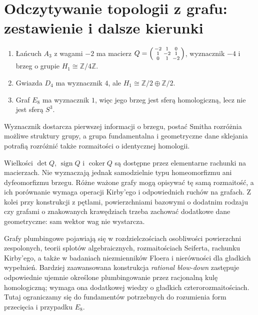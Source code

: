 \section{Odczytywanie topologii z grafu: zestawienie i dalsze kierunki}
\label{sec:tg-plumbing-conclusions}

\begin{przyklad}
\begin{enumerate}[label=(\roman*)]
\item Łańcuch $A_3$ z wagami $-2$ ma macierz
$Q=\begin{psmallmatrix}-2&1&0\\1&-2&1\\0&1&-2\end{psmallmatrix}$,
wyznacznik $-4$ i brzeg o grupie $H_1\cong\mathbb Z/4\mathbb Z$.
\item Gwiazda $D_4$ ma wyznacznik $4$, ale
$H_1\cong\mathbb Z/2\oplus\mathbb Z/2$.
\item Graf $E_8$ ma wyznacznik $1$, więc jego brzeg jest
sferą homologiczną, lecz nie jest sferą $S^3$.
\end{enumerate}
Wyznacznik dostarcza pierwszej informacji o brzegu,
postać Smitha rozróżnia możliwe struktury grupy,
a grupa fundamentalna i geometryczne dane sklejania
potrafią rozróżnić także rozmaitości o identycznej homologii.
\end{przyklad}

\begin{uwaga}
Wielkości $\det Q$, $\operatorname{sign}Q$ i
$\operatorname{coker}Q$ są dostępne przez elementarne rachunki
na macierzach. Nie wyznaczają jednak samodzielnie
typu homeomorfizmu ani dyfeomorfizmu brzegu.
Różne ważone grafy mogą opisywać tę samą rozmaitość,
a ich porównanie wymaga operacji Kirby'ego i odpowiednich
ruchów na grafach. Z kolei przy konstrukcji z pętlami,
powierzchniami bazowymi o dodatnim rodzaju czy grafami
o znakowanych krawędziach trzeba zachować dodatkowe
dane geometryczne: sam wektor wag nie wystarcza.
\end{uwaga}

\begin{uwaga}
Grafy plumbingowe pojawiają się w rozdzielczościach
osobliwości powierzchni zespolonych, teorii splotów
algebraicznych, rozmaitościach Seiferta, rachunku Kirby'ego,
a także w badaniach niezmienników Floera i nierówności
dla gładkich wypełnień. Bardziej zaawansowana konstrukcja
\emph{rational blow-down} zastępuje odpowiednie ujemnie
określone plumbingowanie przez racjonalną kulę homologiczną;
wymaga ona dodatkowej wiedzy o gładkich czterorozmaitościach.
Tutaj ograniczamy się do fundamentów potrzebnych do
rozumienia form przecięcia i przypadku $E_8$.
\end{uwaga}

